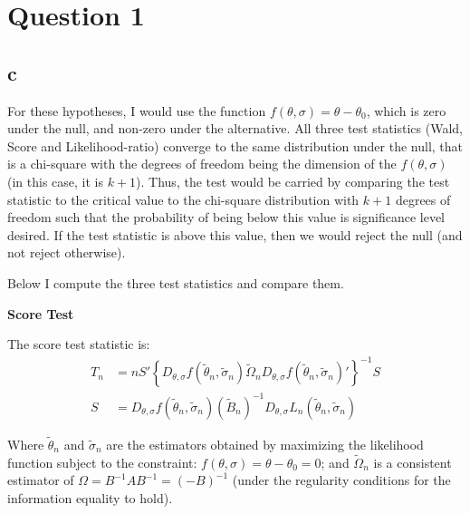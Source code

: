 \documentclass[12pt]{paper}
\begin{document}
\section*{Question 1}

\subsection*{c}

For these hypotheses, I would use the function $f(\theta,\sigma)=\theta-\theta_0$, which is zero under the null, and non-zero under the alternative. All three test statistics (Wald, Score and Likelihood-ratio) converge to the same distribution under the null, that is a chi-square with the degrees of freedom being the dimension of the $f(\theta,\sigma)$ (in this case, it is $k+1$). Thus, the test would be carried by comparing the test statistic to the critical value to the chi-square distribution with $k+1$ degrees of freedom such that the probability of being below this value is significance level desired. If the test statistic is above this value, then we would reject the null (and not reject otherwise).

Below I compute the three test statistics and compare them.

\textbf{Score Test}

The score test statistic is:
\begin{align*}
T_n&=nS'\left\{D_{\theta,\sigma}f(\tilde{\theta}_n,\tilde{\sigma}_n)\tilde{\Omega}_nD_{\theta,\sigma}f(\tilde{\theta}_n,\tilde{\sigma}_n)'\right\}^{-1}S\\
S&=D_{\theta,\sigma}f(\tilde{\theta}_n,\tilde{\sigma}_n)(\tilde{B}_n)^{-1}D_{\theta,\sigma} L_n(\tilde{\theta}_n,\tilde{\sigma}_n)
\end{align*}

Where $\tilde{\theta}_n$ and $\tilde{\sigma}_n$ are the estimators obtained by maximizing the likelihood function subject to the constraint: $f(\theta,\sigma)=\theta-\theta_0=0$; and $\tilde{\Omega}_n$ is a consistent estimator of $\Omega=B^{-1}AB^{-1}=(-B)^{-1}$ (under the regularity conditions for the information equality to hold).
\end{document}
